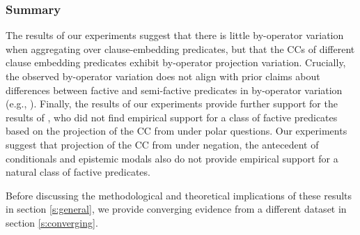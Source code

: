 \documentclass[a4paper,12pt,twoside]{article}
\begin{document}
    


			


   
		\subsubsection{Summary}

  The results of our experiments suggest that there is little by-operator variation when aggregating over clause-embedding predicates, but that the CCs of different clause embedding predicates exhibit by-operator projection variation. 
    Crucially, the observed by-operator variation does not align with prior claims about differences between factive and semi-factive predicates in by-operator variation (e.g., \citealt{karttunen_observations_1971}). Finally, the results of our experiments provide further support for the results of \citealt{degen_are_2022}, who did not find empirical support for a class of factive predicates based on the projection of the CC from under polar questions. Our experiments suggest that projection of the CC from under negation, the antecedent of conditionals and epistemic modals also do not provide empirical support for a natural class of factive predicates.

    Before discussing the methodological and theoretical implications of these results in section \ref{s:general}, we provide converging evidence from a different dataset in section \ref{s:converging}.
   
\end{document}
